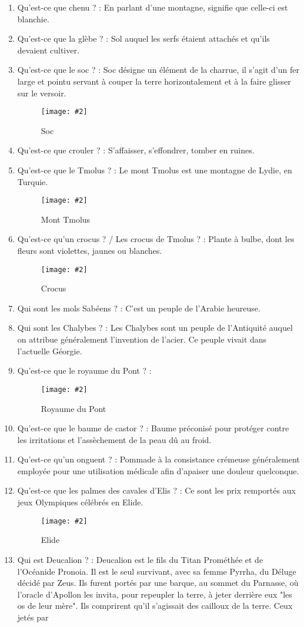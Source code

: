 \documentclass[a4paper, 11pt, hidelinks]{article}
\newcommand{\img}[4]{\begin{figure}[!ht]
    \centering
    \texttt{[image: \#2]}
    \caption{#3}
    \label{#4}
    \end{figure} }
\begin{document}
\begin{enumerate}
      \item Qu'est-ce que chenu ? : En parlant d'une montagne, signifie que celle-ci est blanchie.
      \item Qu'est-ce que la glèbe ? : Sol auquel les serfs étaient attachés et qu'ils devaient cultiver.
      \item Qu'est-ce que le soc ? : Soc désigne un élément de la charrue, il s'agit d'un fer large et pointu servant à
            couper la terre horizontalement et à la faire glisser sur le versoir.
            \img{0.2}{Soc.jpg}{Soc}{11}
      \item Qu'est-ce que crouler ? : S'affaisser, s'effondrer, tomber en ruines.
      \item Qu'est-ce que le Tmolus ? : Le mont Tmolus est une montagne de Lydie, en Turquie.
            \img{0.5}{Tmolus.png}{Mont Tmolus}{12}
      \item Qu'est-ce qu'un crocus ? / Les crocus de Tmolus ? : Plante à bulbe, dont les fleurs sont violettes, jaunes ou blanches.
            \img{0.15}{Crocus.jpg}{Crocus}{13}
      \item Qui sont les mols Sabéens ? : C'est un peuple de l'Arabie heureuse.
      \item Qui sont les Chalybes ? : Les Chalybes sont un peuple de l'Antiquité auquel on attribue généralement l'invention de l'acier. Ce
            peuple vivait dans l'actuelle Géorgie.
      \item Qu'est-ce que le royaume du Pont ? : \img{0.3}{Pont.png}{Royaume du Pont}{14}
      \item Qu'est-ce que le baume de castor ? : Baume préconisé pour protéger contre les irritations et l'assèchement de la peau dû au froid.
      \item Qu'est-ce qu'un onguent ? : Pommade à la consistance crémeuse généralement employée pour une utilisation médicale afin d'apaiser
            une douleur quelconque.
      \item Qu'est-ce que les palmes des cavales d'Elis ? : Ce sont les prix remportés aux jeux Olympiques célébrés en Elide.
            \img{1}{Elide.png}{Elide}{15}
      \item Qui est Deucalion ? : Deucalion est le fils du Titan Prométhée et de l'Océanide Pronoia. Il est le seul survivant, avec sa femme Pyrrha,
            du Déluge décidé par Zeus. Ils furent portés par une barque, au sommet du Parnasse, où l'oracle d'Apollon les invita, pour repeupler
            la terre, à jeter derrière eux "les os de leur mère". Ils comprirent qu'il s'agissait des cailloux de la terre. Ceux jetés par

\end{enumerate}
\end{document}
